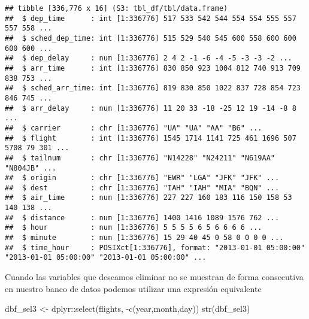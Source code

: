 \documentclass[
]{book}
\newenvironment{Shaded}{\begin{snugshade}}{\end{snugshade}}
\newcommand{\FunctionTok}[1]{\textcolor[rgb]{0.00,0.00,0.00}{#1}}
\newcommand{\NormalTok}[1]{#1}
\newcommand{\OtherTok}[1]{\textcolor[rgb]{0.56,0.35,0.01}{#1}}
\newcommand{\SpecialCharTok}[1]{\textcolor[rgb]{0.00,0.00,0.00}{#1}}
\begin{document}
\begin{verbatim}
## tibble [336,776 x 16] (S3: tbl_df/tbl/data.frame)
##  $ dep_time      : int [1:336776] 517 533 542 544 554 554 555 557 557 558 ...
##  $ sched_dep_time: int [1:336776] 515 529 540 545 600 558 600 600 600 600 ...
##  $ dep_delay     : num [1:336776] 2 4 2 -1 -6 -4 -5 -3 -3 -2 ...
##  $ arr_time      : int [1:336776] 830 850 923 1004 812 740 913 709 838 753 ...
##  $ sched_arr_time: int [1:336776] 819 830 850 1022 837 728 854 723 846 745 ...
##  $ arr_delay     : num [1:336776] 11 20 33 -18 -25 12 19 -14 -8 8 ...
##  $ carrier       : chr [1:336776] "UA" "UA" "AA" "B6" ...
##  $ flight        : int [1:336776] 1545 1714 1141 725 461 1696 507 5708 79 301 ...
##  $ tailnum       : chr [1:336776] "N14228" "N24211" "N619AA" "N804JB" ...
##  $ origin        : chr [1:336776] "EWR" "LGA" "JFK" "JFK" ...
##  $ dest          : chr [1:336776] "IAH" "IAH" "MIA" "BQN" ...
##  $ air_time      : num [1:336776] 227 227 160 183 116 150 158 53 140 138 ...
##  $ distance      : num [1:336776] 1400 1416 1089 1576 762 ...
##  $ hour          : num [1:336776] 5 5 5 5 6 5 6 6 6 6 ...
##  $ minute        : num [1:336776] 15 29 40 45 0 58 0 0 0 0 ...
##  $ time_hour     : POSIXct[1:336776], format: "2013-01-01 05:00:00" "2013-01-01 05:00:00" "2013-01-01 05:00:00" ...
\end{verbatim}

Cuando las variables que deseamos eliminar no se muestran de forma consecutiva en nuestro banco de datos podemos utilizar una expresión equivalente

\begin{Shaded}
\begin{Highlighting}[]
\NormalTok{dbf\_sel3 }\OtherTok{\textless{}{-}}\NormalTok{ dplyr}\SpecialCharTok{::}\FunctionTok{select}\NormalTok{(flights, }\SpecialCharTok{{-}}\FunctionTok{c}\NormalTok{(year,month,day)) }
\FunctionTok{str}\NormalTok{(dbf\_sel3)}
\end{Highlighting}
\end{Shaded}
\end{document}
